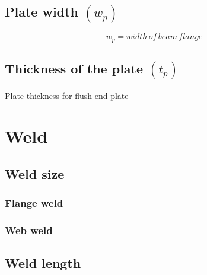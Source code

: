 \documentclass[11.5pt,a4paper,oneside]{report}
\begin{document}
\begin{Form}
			
\section{\large Plate width $(w_{p})$}
			
				\begin{equation}
					\boxed{w_{p} = width \,of \,beam \,flange}
				\end{equation}

\section{Thickness of the plate $(t_{p})$}

Plate thickness for flush end plate
	
	

\chapter{Weld} 
\section{Weld size}
\subsection{Flange weld}
\subsection{Web weld}
\section{Weld length}
\end{Form}
\end{document}
